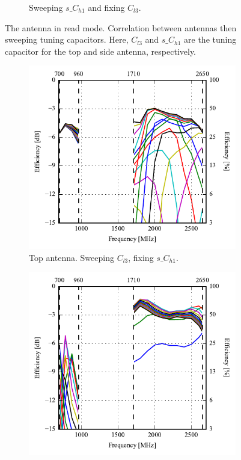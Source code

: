 \begin{figure}[htbp]
\begin{subfigure}{0.49\linewidth}
        \caption{Sweeping $s\_C_{h1}$ and fixing $C_{l3}$.}
    \end{subfigure}
    \caption{The antenna in read mode. Correlation between antennas then sweeping tuning capacitors. Here, $C_{l3}$ and $s\_C_{h1}$ are the tuning capacitor for the top and side antenna, respectively.}
    \label{fig:corr_sol3_read}
\end{figure}

\begin{figure}[htbp]
    \centering
    \begin{subfigure}{0.49\linewidth}
        \centering
        \includegraphics{img/tech_sol/nonresonant/simulation/read_mode/EffSweepAC1/efficiency-ac1-top}
        \caption{Top antenna. Sweeping $C_{l3}$, fixing $s\_C_{h1}$.}
    \end{subfigure}
    \hfill
    \begin{subfigure}{0.49\linewidth}
        \centering
        \includegraphics{img/tech_sol/nonresonant/simulation/read_mode/EffSweepAC2/efficiency-ac2-side}

\end{subfigure}
\end{figure}
